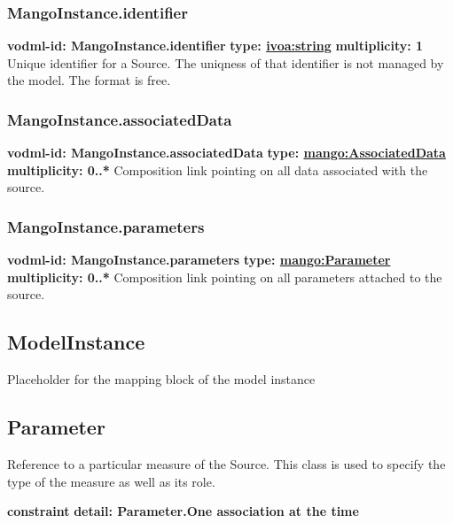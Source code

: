     \subsubsection{MangoInstance.identifier}
      \textbf{vodml-id: MangoInstance.identifier} \newline
      \textbf{type: \hyperref[sect:ivoa]{ivoa:string}} \newline
      \textbf{multiplicity: 1} \newline 
      Unique identifier for a Source. The uniqness of that identifier is not managed by the model. The format is free.

    \subsubsection{MangoInstance.associatedData}
      \textbf{vodml-id: MangoInstance.associatedData} \newline
      \textbf{type: \hyperref[sect:AssociatedData]{mango:AssociatedData}} \newline
      \textbf{multiplicity: 0..*} \newline 
      Composition link pointing on all data associated with the source.

    \subsubsection{MangoInstance.parameters}
      \textbf{vodml-id: MangoInstance.parameters} \newline
      \textbf{type: \hyperref[sect:Parameter]{mango:Parameter}} \newline
      \textbf{multiplicity: 0..*} \newline 
      Composition link pointing on all parameters attached to the source.

  \subsection{ModelInstance}
  \label{sect:ModelInstance}
    Placeholder for the mapping block of the model instance

  \subsection{Parameter}
  \label{sect:Parameter}
    Reference to a particular measure of the Source. This class is used to specify the type of the measure as well as its role.

    \noindent \textbf{constraint} \newline
    \indent    \textbf{detail: Parameter.One association at the time
 }\newline


